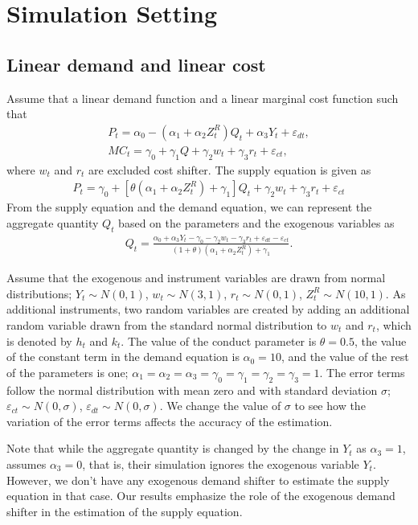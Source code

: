 \documentclass[11pt, a4paper]{article}
\begin{document}
\section{Simulation Setting}

\subsection{Linear demand and linear cost}
Assume that a linear demand function and a linear marginal cost function such that
\begin{align}
    P_t = \alpha_0 - (\alpha_1 + \alpha_2Z^R_t)Q_t + \alpha_3 Y_t + \varepsilon_{dt},\\
    MC_t = \gamma_0  + \gamma_1 Q + \gamma_2 w_t + \gamma_3 r_t + \varepsilon_{ct},
\end{align}
where $w_t$ and $r_t$ are excluded cost shifter.
The supply equation is given as
\begin{align}
    P_t = \gamma_0 + [\theta(\alpha_1 + \alpha_2Z^R_t)+ \gamma_1] Q_t   + \gamma_2 w_t + \gamma_3 r_t + \varepsilon_{ct}
\end{align}
From the supply equation and the demand equation, we can represent the aggregate quantity $Q_t$ based on the parameters and the exogenous variables as   
\begin{align}
    Q_t =  \frac{\alpha_0 + \alpha_3 Y_t - \gamma_0 - \gamma_2 w_t - \gamma_3 r_t + \varepsilon_{dt} - \varepsilon_{ct}}{(1 + \theta) (\alpha_1 + \alpha_2Z^R_t) + \gamma_1}.
\end{align}

Assume that the exogenous and instrument variables are drawn from normal distributions; $ Y_t \sim N(0,1)$, $w_t \sim N (3, 1)$, $r_t \sim N (0, 1)$, $ Z^R_t \sim N (10, 1)$.
As additional instruments, two random variables are created by adding an additional random variable drawn from the standard normal distribution to $w_t$ and $r_t$, which is denoted by $h_t$ and $k_t$.
The value of the conduct parameter is $\theta = 0.5$, the value of the constant term in the demand equation is $\alpha_0 = 10$, and the value of the rest of the parameters is one; $\alpha_1 = \alpha_2 = \alpha_3 = \gamma_0 = \gamma_1 = \gamma_2  = \gamma_3 = 1$. 
The error terms follow the normal distribution with mean zero and with standard deviation $\sigma$; $\varepsilon_{ct}\sim N(0,\sigma)$, $\varepsilon_{dt} \sim N(0,\sigma)$.
We change the value of $\sigma$ to see how the variation of the error terms affects the accuracy of the estimation.

Note that while the aggregate quantity is changed by the change in $Y_t$ as $\alpha_3 =1$, \cite{perloff2012collinearity} assumes $\alpha_3 = 0$, that is, their simulation ignores the exogenous variable $Y_t$.
However, we don't have any exogenous demand shifter to estimate the supply equation in that case.
Our results emphasize the role of the exogenous demand shifter in the estimation of the supply equation.
\end{document}
